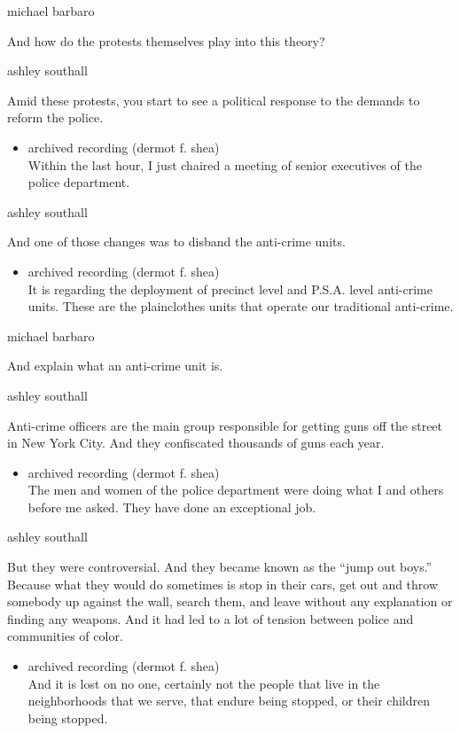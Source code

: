 michael barbaro

And how do the protests themselves play into this theory?

ashley southall

Amid these protests, you start to see a political response to the
demands to reform the police.

\begin{itemize}
\tightlist
\item
  archived recording (dermot f. shea)\\
  Within the last hour, I just chaired a meeting of senior executives of
  the police department.
\end{itemize}

ashley southall

And one of those changes was to disband the anti-crime units.

\begin{itemize}
\tightlist
\item
  archived recording (dermot f. shea)\\
  It is regarding the deployment of precinct level and P.S.A. level
  anti-crime units. These are the plainclothes units that operate our
  traditional anti-crime.
\end{itemize}

michael barbaro

And explain what an anti-crime unit is.

ashley southall

Anti-crime officers are the main group responsible for getting guns off
the street in New York City. And they confiscated thousands of guns each
year.

\begin{itemize}
\tightlist
\item
  archived recording (dermot f. shea)\\
  The men and women of the police department were doing what I and
  others before me asked. They have done an exceptional job.
\end{itemize}

ashley southall

But they were controversial. And they became known as the ``jump out
boys.'' Because what they would do sometimes is stop in their cars, get
out and throw somebody up against the wall, search them, and leave
without any explanation or finding any weapons. And it had led to a lot
of tension between police and communities of color.

\begin{itemize}
\tightlist
\item
  archived recording (dermot f. shea)\\
  And it is lost on no one, certainly not the people that live in the
  neighborhoods that we serve, that endure being stopped, or their
  children being stopped.
\end{itemize}

